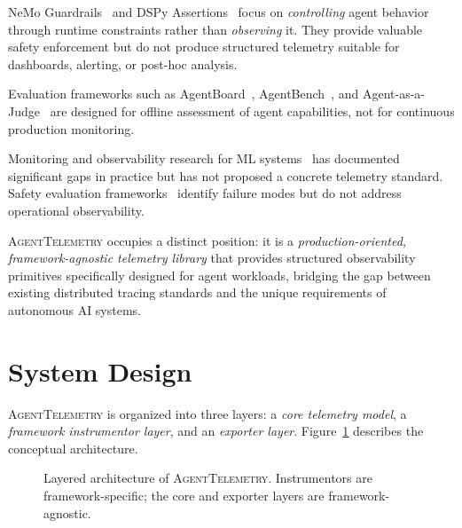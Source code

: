 \documentclass[sigconf,nonacm]{acmart}
\begin{document}
NeMo Guardrails~\cite{nemo_guardrails} and DSPy
Assertions~\cite{dspy_assertions} focus on \emph{controlling} agent
behavior through runtime constraints rather than \emph{observing} it.
They provide valuable safety enforcement but do not produce structured
telemetry suitable for dashboards, alerting, or post-hoc analysis.

Evaluation frameworks such as AgentBoard~\cite{agentboard},
AgentBench~\cite{agentbench}, and Agent-as-a-Judge~\cite{agent_as_judge}
are designed for offline assessment of agent capabilities, not for
continuous production monitoring.

Monitoring and observability research for ML systems~\cite{ml_monitoring}
has documented significant gaps in practice but has not proposed a
concrete telemetry standard.  Safety evaluation
frameworks~\cite{openagentsafety, toolemu} identify failure modes but do
not address operational observability.

\textsc{AgentTelemetry} occupies a distinct position: it is a
\emph{production-oriented, framework-agnostic telemetry library} that
provides structured observability primitives specifically designed for
agent workloads, bridging the gap between existing distributed tracing
standards and the unique requirements of autonomous AI systems.

\section{System Design}
\label{sec:design}

\textsc{AgentTelemetry} is organized into three layers: a \emph{core
telemetry model}, a \emph{framework instrumentor layer}, and an
\emph{exporter layer}.  Figure~\ref{fig:architecture} describes the
conceptual architecture.

\begin{figure}[t]
\centering
{}
\caption{Layered architecture of \textsc{AgentTelemetry}.  Instrumentors are
framework-specific; the core and exporter layers are framework-agnostic.}
\label{fig:architecture}
\end{figure}
\end{document}
